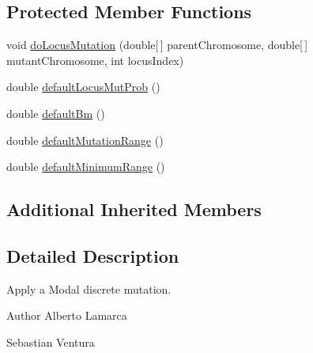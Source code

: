 \subsection*{Protected Member Functions}
\begin{DoxyCompactItemize}
\item 
void \hyperlink{classnet_1_1sf_1_1jclec_1_1realarray_1_1mut_1_1_modal_discrete_mutator_a2b46e92727f9c90d406d4e3eb5bc3370}{do\-Locus\-Mutation} (double\mbox{[}$\,$\mbox{]} parent\-Chromosome, double\mbox{[}$\,$\mbox{]} mutant\-Chromosome, int locus\-Index)
\item 
double \hyperlink{classnet_1_1sf_1_1jclec_1_1realarray_1_1mut_1_1_modal_discrete_mutator_addac368f8ad279ab67b9b2916d6e950f}{default\-Locus\-Mut\-Prob} ()
\item 
double \hyperlink{classnet_1_1sf_1_1jclec_1_1realarray_1_1mut_1_1_modal_discrete_mutator_a37c3f77387a2188c7643cb9a0c9ae580}{default\-Bm} ()
\item 
double \hyperlink{classnet_1_1sf_1_1jclec_1_1realarray_1_1mut_1_1_modal_discrete_mutator_a6f415628cc75a31714dc04136fded6e9}{default\-Mutation\-Range} ()
\item 
double \hyperlink{classnet_1_1sf_1_1jclec_1_1realarray_1_1mut_1_1_modal_discrete_mutator_a6ce89540902df1d509dcbd9ac98805a9}{default\-Minimum\-Range} ()
\end{DoxyCompactItemize}
\subsection*{Additional Inherited Members}


\subsection{Detailed Description}
Apply a Modal discrete mutation.

\begin{DoxyAuthor}{Author}
Alberto Lamarca 

Sebastian Ventura 
\end{DoxyAuthor}


